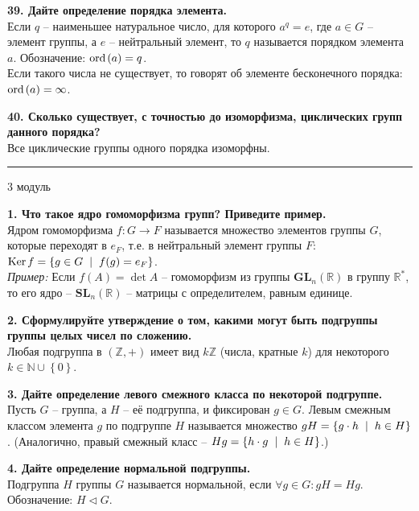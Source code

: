 \documentclass[11pt,a4paper]{article}
\newcommand{\N}{\mathbb{N}}
\newcommand{\Z}{\mathbb{Z}}
\newcommand{\R}{\mathbb{R}}
\newcommand{\Ker}[1]{\mathrm{Ker}\hspace{0.5mm}#1}
\newcommand{\Ord}[1]{\mathrm{ord}\hspace{0.5mm}#1}
\renewcommand{\mid}{\hspace{2mm}\middle|\hspace{2mm}}
\begin{document}
\textbf{39. Дайте определение порядка элемента.\\}
Если $q$ -- наименьшее натуральное число, для которого $a^q = e$, где $a \in G$ -- элемент группы, а $e$ -- нейтральный элемент, то $q$ называется порядком элемента $a$. Обозначение: $\Ord (a) = q$.\\
Если такого числа не существует, то говорят об элементе бесконечного порядка: $\Ord (a) = \infty$.

\textbf{40. Сколько существует, с точностью до изоморфизма, циклических групп данного порядка?\\}
Все циклические группы одного порядка изоморфны.

\rule{\linewidth}{0.3mm}

\vspace{1mm}
\begin{center}
\begin{LARGE}
\textsf{3 модуль}
\end{LARGE}
\end{center}
\vspace{1mm}

\textbf{1. Что такое ядро гомоморфизма групп? Приведите пример.\\}
Ядром гомоморфизма $f: G \rightarrow F$ называется множество элементов группы $G$, которые переходят в $e_F$, т.е. в нейтральный элемент группы $F$: $\Ker{f} = \left\{ g \in G \mid f(g) = e_F \right\}$.\\
\textit{Пример:} Если $f(A) = \det A$ -- гомоморфизм из группы $\mathbf{GL}_n( \R )$ в группу $\R^*$, то его ядро -- $\mathbf{SL}_n( \R )$ -- матрицы с определителем, равным единице.

\textbf{2. Сформулируйте утверждение о том, какими могут быть подгруппы группы целых чисел по сложению.\\}
Любая подгруппа в $\left( \Z, + \right)$ имеет вид $k\Z$ (числа, кратные $k$) для некоторого $k \in \N \cup \left\{ 0 \right\}$.

\textbf{3. Дайте определение левого смежного класса по некоторой подгруппе.\\}
Пусть $G$ -- группа, а $H$ -- её подгруппа, и фиксирован $g \in G$. Левым смежным классом элемента $g$ по подгруппе $H$ называется множество $gH = \left\{ g \cdot h \mid h \in H \right\}$. (Аналогично, правый смежный класс -- $Hg = \left\{ h \cdot g \mid h \in H \right\}$.)

\textbf{4. Дайте определение нормальной подгруппы.\\}
Подгруппа $H$ группы $G$ называется нормальной, если $\forall g \in G: gH = Hg$. Обозначение: $H \triangleleft G$.
\end{document}
